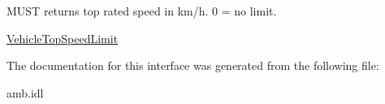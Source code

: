 M\-U\-S\-T returns top rated speed in km/h. 0 = no limit. 

\hyperlink{interfaceVehicle_1_1org_1_1automotive_1_1VehicleTopSpeedLimit}{Vehicle\-Top\-Speed\-Limit} 

The documentation for this interface was generated from the following file\-:\begin{DoxyCompactItemize}
\item 
amb.\-idl\end{DoxyCompactItemize}
